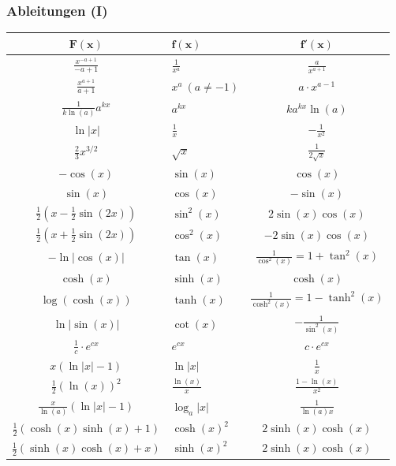 \documentclass[a4paper,10pt]{article}
\begin{document}
\subsubsection{Ableitungen (I)}
\begin{center}
  \begin{tabularx}{\linewidth}{c>{\centering\arraybackslash}Xc}
  \toprule
  $\mathbf{F(x)}$ & $\mathbf{f(x)}$ & $\mathbf{f'(x)}$ \\
  \midrule
  $\frac{x^{-a+1}}{-a+1}$ & $\frac{1}{x^a}$ & $\frac{a}{x^{a+1}}$ \\
  $\frac{x^{a+1}}{a+1}$ & $x^a \ (a \ne -1)$ & $a \cdot x^{a-1}$ \\
  $\frac{1}{k \ln(a)}a^{kx}$ & $a^{kx}$ & $ka^{kx} \ln(a)$ \\
  $\ln |x|$ & $\frac{1}{x}$ & $-\frac{1}{x^2}$ \\
  $\frac{2}{3}x^{3/2}$ & $\sqrt{x}$ & $\frac{1}{2\sqrt{x}}$\\
  $-\cos(x)$ & $\sin(x)$ & $\cos(x)$ \\
  $\sin(x)$ & $\cos(x)$ & $-\sin(x)$ \\
  $\frac{1}{2}(x-\frac{1}{2}\sin(2x))$ & $\sin^2(x)$ & $2 \sin(x)\cos(x)$ \\
  $\frac{1}{2}(x + \frac{1}{2}\sin(2x))$ & $\cos^2(x)$ & $-2\sin(x)\cos(x)$ \\
  $-\ln|\cos(x)|$ & $\tan(x)$ & $\frac{1}{\cos^2(x)} = 1 + \tan^2(x)$  \\
  $\cosh(x)$ & $\sinh(x)$ & $\cosh(x)$ \\
  $\log(\cosh(x))$ & $\tanh(x)$ & $\frac{1}{\cosh^2(x)} = 1 - \tanh^2(x)$ \\
  $\ln | \sin(x)|$ & $\cot(x)$ & $-\frac{1}{\sin^2(x)}$ \\
  $\frac{1}{c} \cdot e^{cx}$ & $e^{cx}$ & $c \cdot e^{cx}$ \\
  $x(\ln |x| - 1)$ & $\ln |x|$ & $\frac{1}{x}$ \\
  $\frac{1}{2}(\ln(x))^2$ & $\frac{\ln(x)}{x}$ & $\frac{1 - \ln(x)}{x^2}$ \\
  $\frac{x}{\ln(a)} (\ln|x| -1)$ & $\log_a |x|$ & $\frac{1}{\ln(a)x}$ \\
  $\frac{1}{2}(\cosh(x)\sinh(x)+1)$ & $\cosh(x)^2$ & $2\sinh(x)\cosh(x)$\\
  $\frac{1}{2}(\sinh(x)\cosh(x) + x)$ & $\sinh(x)^2$ & $2\sinh(x)\cosh(x)$\\
  \bottomrule
  \end{tabularx}
\end{center}
\end{document}
